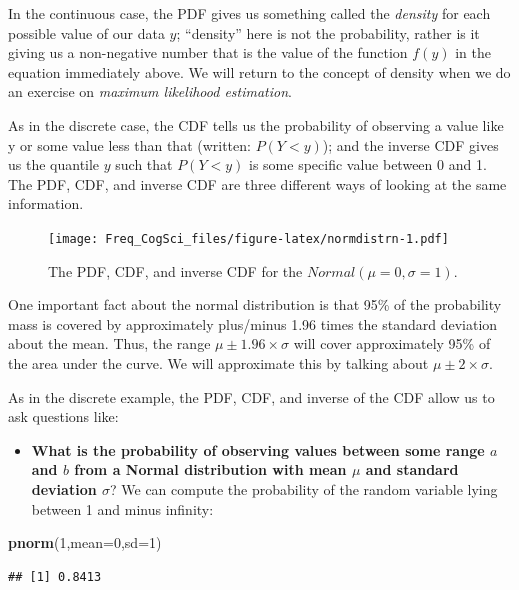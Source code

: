 \documentclass[12pt,]{krantz}
\newenvironment{Shaded}{\begin{snugshade}}{\end{snugshade}}
\newcommand{\DataTypeTok}[1]{\textcolor[rgb]{0.13,0.29,0.53}{#1}}
\newcommand{\DecValTok}[1]{\textcolor[rgb]{0.00,0.00,0.81}{#1}}
\newcommand{\KeywordTok}[1]{\textcolor[rgb]{0.13,0.29,0.53}{\textbf{#1}}}
\newcommand{\NormalTok}[1]{#1}
\providecommand{\tightlist}{%
  \setlength{\itemsep}{0pt}\setlength{\parskip}{0pt}}
\begin{document}
In the continuous case, the PDF gives us something called the \emph{density} for each possible value of our data \(y\); ``density'' here is not the probability, rather is it giving us a non-negative number that is the value of the function \(f(y)\) in the equation immediately above. We will return to the concept of density when we do an exercise on \emph{maximum likelihood estimation}.

As in the discrete case, the CDF tells us the probability of observing a value like y or some value less than that (written: \(P(Y<y)\)); and the inverse CDF gives us the quantile \(y\) such that \(P(Y<y)\) is some specific value between 0 and 1. The PDF, CDF, and inverse CDF are three different ways of looking at the same information.

\begin{figure}
\centering
\texttt{[image: Freq\_CogSci\_files/figure-latex/normdistrn-1.pdf]}
\caption{\label{fig:normdistrn}The PDF, CDF, and inverse CDF for the \(Normal(\mu=0,\sigma=1)\).}
\end{figure}

One important fact about the normal distribution is that 95\% of the probability mass is covered by approximately plus/minus 1.96 times the standard deviation about the mean. Thus, the range \(\mu\pm 1.96\times \sigma\) will cover approximately 95\% of the area under the curve. We will approximate this by talking about \(\mu\pm 2\times \sigma\).

As in the discrete example, the PDF, CDF, and inverse of the CDF allow us to ask questions like:

\begin{itemize}
\tightlist
\item
  \textbf{What is the probability of observing values between some range \(a\) and \(b\) from a Normal distribution with mean \(\mu\) and standard deviation \(\sigma\)}? We can compute the probability of the random variable lying between 1 and minus infinity:
\end{itemize}

\begin{Shaded}
\begin{Highlighting}[]
\KeywordTok{pnorm}\NormalTok{(}\DecValTok{1}\NormalTok{,}\DataTypeTok{mean=}\DecValTok{0}\NormalTok{,}\DataTypeTok{sd=}\DecValTok{1}\NormalTok{)}
\end{Highlighting}
\end{Shaded}

\begin{verbatim}
## [1] 0.8413
\end{verbatim}
\end{document}
